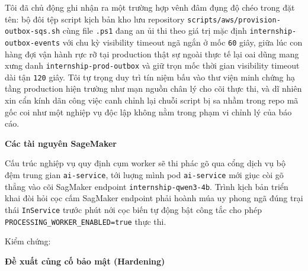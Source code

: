 Tôi đã chủ động ghi nhận ra một trường hợp vênh đâm đụng độ chéo trong
đặt tên: bộ đôi tệp script kịch bản kho lưu repository
\texttt{scripts/\allowbreak{}aws/\allowbreak{}provision-\allowbreak{}outbox-\allowbreak{}sqs.\allowbreak{}sh} cùng file \texttt{.\allowbreak{}ps1}
đang an ủi thi theo giá trị mặc định \texttt{internship-\allowbreak{}outbox-\allowbreak{}events}
với chu kỳ visibility timeout ngã ngắn ở mốc \texttt{60} giây, giữa lúc
con hàng đợi vận hành rực rỡ tại production thật sự ngoài thực tế lại
oai dũng mang xưng danh \texttt{internship-\allowbreak{}prod-\allowbreak{}outbox} và giữ trọn mốc
thời gian visibility timeout dài tận \texttt{120} giây. Tôi tự trọng duy
trì tín niệm bấu vào thư viện minh chứng hạ tầng production hiện trường
như mạn nguồn chân lý cho cõi thực thi, và dĩ nhiên xin cẩn kính dãn
công việc canh chỉnh lại chuỗi script bị sa nhầm trong repo mã gốc coi
như một nghiệp vụ độc lập không nằm trong phạm vi chỉnh lý của báo cáo.

\vspace{0.5em}\noindent\textbf{Các tài nguyên
SageMaker}\par

Cấu trúc nghiệp vụ quy định cụm worker sẽ thi phác gõ qua cổng dịch vụ
bộ đệm trung gian \texttt{ai-\allowbreak{}service}, tới luợng mình pod
\texttt{ai-\allowbreak{}service} mới giục còi gõ thẳng vào cõi SagMaker endpoint
\texttt{internship-\allowbreak{}qwen3-\allowbreak{}4b}. Trình kịch bản triển khai đòi hỏi cọc cấm
SagMaker endpoint phải hoành múa uy phong ngã đúng trại thái
\texttt{InService} trước phút nới cọc biến tự động bật công tắc cho phép
\texttt{PROCESSING\_\allowbreak{}WORKER\_\allowbreak{}ENABLED=true} thực thi.

Kiểm chứng:

\begin{Shaded}
\begin{Highlighting}[]
\end{Highlighting}
\end{Shaded}

\vspace{0.5em}\noindent\textbf{Đề xuất củng cố bảo mật
(Hardening)}\par

